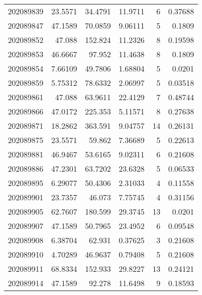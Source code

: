 \begin{tabular}{rrrrrr}
 202089839 &         23.5571  &       34.4791 &           11.9711  &           6 & 0.37688 \\
 202089847 &         47.1589  &       70.0859 &            9.06111 &           5 & 0.1809  \\
 202089852 &         47.088   &      152.824  &           11.2326  &           8 & 0.19598 \\
 202089853 &         46.6667  &       97.952  &           11.4638  &           8 & 0.1809  \\
 202089854 &          7.66109 &       49.7806 &            1.68804 &           5 & 0.0201  \\
 202089859 &          5.75312 &       78.6332 &            2.06997 &           5 & 0.03518 \\
 202089861 &         47.088   &       63.9611 &           22.4129  &           7 & 0.48744 \\
 202089866 &         47.0172  &      225.353  &            5.11571 &           8 & 0.27638 \\
 202089871 &         18.2862  &      363.591  &            9.04757 &          14 & 0.26131 \\
 202089875 &         23.5571  &       59.862  &            7.36689 &           5 & 0.22613 \\
 202089881 &         46.9467  &       53.6165 &            9.02311 &           6 & 0.21608 \\
 202089886 &         47.2301  &       63.7202 &           23.6328  &           5 & 0.06533 \\
 202089895 &          6.29077 &       50.4306 &            2.31033 &           4 & 0.11558 \\
 202089901 &         23.7357  &       46.073  &            7.75745 &           4 & 0.31156 \\
 202089905 &         62.7607  &      180.599  &           29.3745  &          13 & 0.0201  \\
 202089907 &         47.1589  &       50.7965 &           23.4952  &           6 & 0.09548 \\
 202089908 &          6.38704 &       62.931  &            0.37625 &           3 & 0.21608 \\
 202089910 &          4.70289 &       46.9637 &            0.79408 &           5 & 0.21608 \\
 202089911 &         68.8334  &      152.933  &           29.8227  &          13 & 0.24121 \\
 202089914 &         47.1589  &       92.278  &           11.6498  &           9 & 0.18593 \\

\end{tabular}
